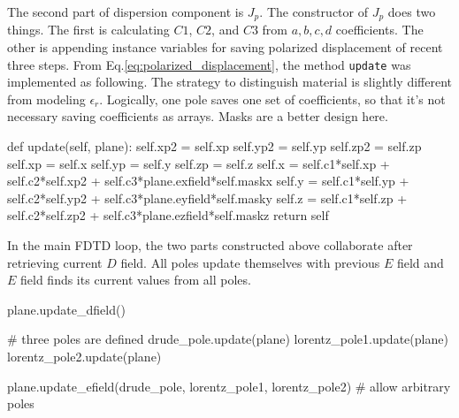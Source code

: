 The second part of dispersion component is $J_p$. The constructor of $J_p$ does two things. The first is calculating
$C1$, $C2$, and $C3$ from $a,b,c,d$ coefficients. The other is appending instance variables for saving polarized
displacement of recent three steps. From Eq.\ref{eq:polarized_displacement}, the method \texttt{update} was implemented
as following. The strategy to distinguish material is slightly different from modeling $\epsilon_r$. Logically, one pole
saves one set of coefficients, so that it's not necessary saving coefficients as arrays. Masks are a better design here.
\begin{code}
    def update(self, plane):
        self.xp2 = self.xp
        self.yp2 = self.yp
        self.zp2 = self.zp
        self.xp = self.x
        self.yp = self.y
        self.zp = self.z
        self.x = self.c1*self.xp + self.c2*self.xp2 + self.c3*plane.exfield*self.maskx
        self.y = self.c1*self.yp + self.c2*self.yp2 + self.c3*plane.eyfield*self.masky
        self.z = self.c1*self.zp + self.c2*self.zp2 + self.c3*plane.ezfield*self.maskz
        return self
\end{code}
In the main FDTD loop, the two parts constructed above collaborate after retrieving current $D$ field. All poles update
themselves with previous $E$ field and $E$ field finds its current values from all poles.
\begin{code}
  plane.update_dfield()

  # three poles are defined 
  drude_pole.update(plane)
  lorentz_pole1.update(plane)
  lorentz_pole2.update(plane)

  plane.update_efield(drude_pole, lorentz_pole1, lorentz_pole2) # allow arbitrary poles 
\end{code}
